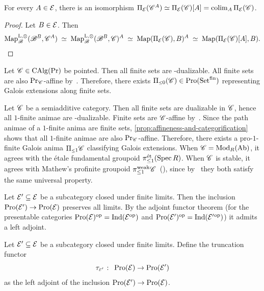 \documentclass[english,svgnames,table]{article}
\begin{document}
    \begin{example}
    \label{exm:galois-anima-of-local-systems}
        For every $A \in \cT$, there is an isomorphism $\piT(\cC^A) \simeq \piT(\cC)[A] = \colim_A \piT(\cC)$.
    \end{example}
    \begin{proof}
        Let $B \in \cT$. Then
        \begin{equation*}
            \MapBo(\basecat^B, \cC^A) \;\simeq\; \MapBo(\basecat^B, \cC)^A \;\simeq\; \Map(\piT(\cC), B)^A \;\simeq\; \Map(\piT(\cC)[A], B).
        \end{equation*}
    \end{proof}
    
    \begin{example}
        Let $\cC \in \CAlg(\Pr)$ be pointed. Then all finite sets are \CO-dualizable. All finite sets are also $\ModC$-affine by~\cite[Example~2.35]{BCSY-Fourier}.
        Therefore, there exists $\pim[0](\cC) \in \Pro(\Set^{\mrm{fin}})$ representing Galois extensions along finite sets.
    \end{example}
        
    
    \begin{example}
    \label{exm:classical-case}
        Let $\cC$ be a semiadditive category. 
        Then all finite sets are dualizable in $\cC$, hence all $1$-finite animae are \CO-dualizable. 
        Finite sets are $\cC$-affine by~\cite[Example~2.35]{BCSY-Fourier}. Since the path animae of a $1$-finite anima are finite sets, \cref{prop:affineness-and-categorification} shows that all $1$-finite animae are also $\ModC$-affine.
        Therefore, there exists a pro-$1$-finite Galois anima $\pim[1] \cC$ classifying Galois extensions.        
        When $\cC = \Mod_R(\Ab)$, it agrees with the \'etale fundamental groupoid $\pi^{\et}_{\le 1} (\Spec R)$. 
        When $\cC$ is stable, it agrees with Mathew's profinite groupoid $\pi_{\le 1}^{\mrm{weak}} \cC$~(\cite[Definition~6.8]{Mathew-2016-Galois}), since by~\cite[Proposition~6.13]{Mathew-2016-Galois} they both satisfy the same universal property.
    \end{example}
    
    Let $\cT' \subseteq \cT$ be a subcategory closed under finite limits. Then the inclusion $\Pro(\cT') \to \Pro(\cT)$ preserves all limits. By the adjoint functor theorem (for the presentable categories $\Pro(\cT)\op = \Ind(\cT\op)$ and $\Pro(\cT')\op = \Ind(\cT'{}\op)$) it admits a left adjoint.
    \begin{definition}
    \label{def:protruncation-of-Ts}
        Let $\cT' \subseteq \cT$ be a subcategory closed under finite limits. Define the truncation functor
        \begin{equation*}
            \tau_{\scriptscriptstyle\cT'} \;\colon\; \Pro(\cT) \to \Pro(\cT')
        \end{equation*}
         as the left adjoint of the inclusion $\Pro(\cT') \to \Pro(\cT)$.
    \end{definition}
    
\end{document}
